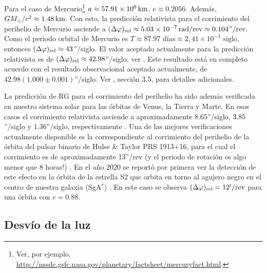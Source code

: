 Para el caso de Mercurio\footnote{Ver, por ejemplo, \url{http://nssdc.gsfc.nasa.gov/planetary/factsheet/mercuryfact.html}.}  $a\approx 57.91\times 10^6\text{\,km}$, $e\approx 0.2056$. Además, $GM_\odot/c^2\approx 1.48\text{\,km}$. Con esto, la predicción relativista para el corrimiento del perihelio de Mercurio asciende a $(\Delta\varphi)_{\rm rel}\approx 5.03\times 10^{-7}{\,\rm rad/rev}\approx 0.104$''/rev. Como el periodo orbital de Mercurio es $T\approx 87.97\text{ días}\approx 2,41\times 10^{-3}\text{ siglo}$, entonces  $(\Delta\varphi)_{\rm rel}\approx 43$''/siglo. El valor aceptado actualmente para la predicción relativista es de $(\Delta\varphi)_{\rm rel}\approx 42.98$''/siglo, ver \cite{NW86}. Este resultado está en completo acuerdo con el resultado observacional aceptado actualmente, de $42.98(1.000\pm 0.001)$''/siglo. Ver \cite{Will06}, sección 3.5, para detalles adicionales.

La predicción de RG para el corrimiento del perihelio ha sido además verificada en nuestro sistema solar para las órbitas de Venus, la Tierra y Marte. En esos casos el corrimiento relativista asciende a aproximadamente $8.65$''/siglo, $3.85$''/siglo y $1.36$''/siglo, respectivamente \cite{OR94}. Una de las mejores verificaciones actualmente disponible es la correspondiente al corrimiento del perihelio de la órbita del pulsar binario de Hulse \& Taylor PRS 1913+16, para el cual el corrimiento es de aproximadamente 13''/rev (y el periodo de rotación es algo menor que 8 horas!) \cite{Taylor93}. En el año 2020 se reportó por primera vez la detección de este efecto en la órbita de la estrella S2 que orbita en torno al agujero negro en el centro de nuestra galaxia (SgA${}^*$) \cite{GRAVITY2020}. En este caso se observa $(\Delta\varphi)_{\rm rel} = 12'/\rm rev$ para una órbita con $e=0.88$.

\subsection{Desvío de la luz}

